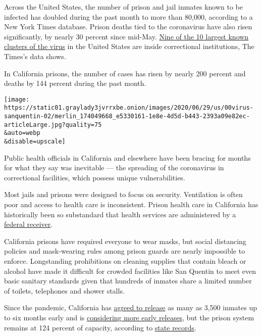 Across the United States, the number of prison and jail inmates known to
be infected has doubled during the past month to more than 80,000,
according to a New York Times database. Prison deaths tied to the
coronavirus have also risen significantly, by nearly 30 percent since
mid-May.
\href{https://www.nytimes3xbfgragh.onion/interactive/2020/us/coronavirus-us-cases.html\#clusters}{Nine
of the 10 largest known clusters of the virus} in the United States are
inside correctional institutions, The Times's data shows.

In California prisons, the number of cases has risen by nearly 200
percent and deaths by 144 percent during the past month.

\texttt{[image: https://static01.graylady3jvrrxbe.onion/images/2020/06/29/us/00virus-sanquentin-02/merlin\_174049668\_e5330161-1e8e-4d5d-b443-2393a09e82ec-articleLarge.jpg?quality=75\\\&auto=webp\\\&disable=upscale]}

Public health officials in California and elsewhere have been bracing
for months for what they say was inevitable --- the spreading of the
coronavirus in correctional facilities, which possess unique
vulnerabilities.

Most jails and prisons were designed to focus on security. Ventilation
is often poor and access to health care is inconsistent. Prison health
care in California has historically been so substandard that health
services are administered by a
\href{https://cchcs.ca.gov/wp-content/uploads/sites/60/2018/09/Receiver-FactSheet.pdf}{federal
receiver}.

California prisons have required everyone to wear masks, but social
distancing policies and mask-wearing rules among prison guards are
nearly impossible to enforce. Longstanding prohibitions on cleaning
supplies that contain bleach or alcohol have made it difficult for
crowded facilities like San Quentin to meet even basic sanitary
standards given that hundreds of inmates share a limited number of
toilets, telephones and shower stalls.

Since the pandemic, California has
\href{https://www.cdcr.ca.gov/news/2020/03/31/cdcr-announces-plan-to-further-protect-staff-and-inmates-from-the-spread-of-covid-19-in-state-prisons/}{agreed
to release} as many as 3,500 inmates up to six months early and is
\href{https://www.cdcr.ca.gov/news/2020/06/16/cdcr-announces-community-supervision-program-to-further-protect-inmates-and-staff-from-the-spread-of-covid-19/}{considering
more early releases}, but the prison system remains at 124 percent of
capacity, according to
\href{https://www.cdcr.ca.gov/research/population-reports-2/}{state
records}.


